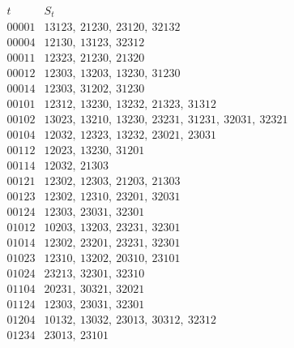 \[\begin{array}{c|l}t&S_t\\\hline
00001&13123,\ 21230,\ 23120,\ 32132\\
00004&12130,\ 13123,\ 32312\\
00011&12323,\ 21230,\ 21320\\
00012&12303,\ 13203,\ 13230,\ 31230\\
00014&12303,\ 31202,\ 31230\\
00101&12312,\ 13230,\ 13232,\ 21323,\ 31312\\
00102&13023,\ 13210,\ 13230,\ 23231,\ 31231,\ 32031,\ 32321\\
00104&12032,\ 12323,\ 13232,\ 23021,\ 23031\\
00112&12023,\ 13230,\ 31201\\
00114&12032,\ 21303\\
00121&12302,\ 12303,\ 21203,\ 21303\\
00123&12302,\ 12310,\ 23201,\ 32031\\
00124&12303,\ 23031,\ 32301\\
01012&10203,\ 13203,\ 23231,\ 32301\\
01014&12302,\ 23201,\ 23231,\ 32301\\
01023&12310,\ 13202,\ 20310,\ 23101\\
01024&23213,\ 32301,\ 32310\\
01104&20231,\ 30321,\ 32021\\
01124&12303,\ 23031,\ 32301\\
01204&10132,\ 13032,\ 23013,\ 30312,\ 32312\\
01234&23013,\ 23101\\
\end{array}\]
